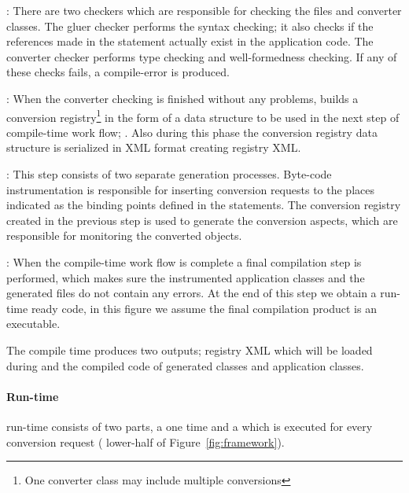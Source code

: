 \begin{description}
\item{}: There are two checkers which are responsible for checking the \gluer files and converter classes. The gluer checker performs the syntax checking; it also checks if the references made in the \gluer statement actually exist in the application code. The converter checker performs type checking and well-formedness checking. If any of these checks fails, a compile-error is produced. 
\item{}: When the converter checking is finished without any problems, \zamk builds a conversion registry\footnote{One converter class may include multiple conversions} in the form of a data structure to be used in the next step of compile-time work flow; . Also during this phase the conversion registry data structure is serialized in XML format creating registry XML. 
\item{}: This step consists of two separate generation processes. Byte-code instrumentation is responsible for inserting \zamk conversion requests to the places indicated as the binding points defined in the \gluer statements. The conversion registry created in the previous step is used to generate the conversion aspects, which are responsible for monitoring the converted objects. 
\item{}: When the compile-time work flow is complete a final compilation step is performed, which makes sure the instrumented application classes and the generated files do not contain any errors. At the end of this step we obtain a \zamk run-time ready code, in this figure we assume the final compilation product is an executable.
\end{description}
 
The \zamk compile time produces two outputs; registry XML which will be loaded during  and the compiled code of \zamk generated classes and application classes. 


\paragraph{Run-time}

\zamk run-time consists of two parts, a one time  and a  which is executed for every conversion request (
lower-half of Figure~\ref{fig:framework}). 


